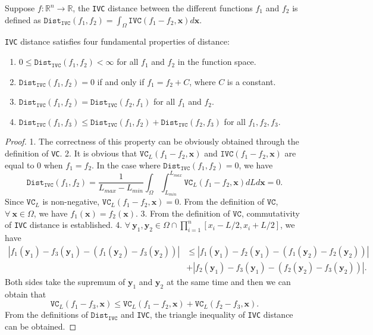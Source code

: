 \documentclass[final]{siamart220329}
\newtheorem{theoretical insights}{Theoretical insights}
\newtheorem{practical takeaway}{Practical takeaway}
\begin{document}
{{{{\begin{definition}\label{IVCD}  Suppose \(f:\mathbb{R}^n \rightarrow\mathbb{R}\), the \texttt{IVC} distance between the different functions \(f_1\) and \(f_2\) is defined as  
\(\texttt{Dist}_{\texttt{IVC}}(f_1,f_2)=\int_{\Omega}\texttt{IVC}(f_1-f_2,{\bm x})d{\bm x}.
\) 
\end{definition}
 
\begin{theorem}
\texttt{IVC} distance satisfies four fundamental properties of distance:

\begin{enumerate}
\item $0\leq \texttt{Dist}_{\texttt{IVC}}(f_1,f_2)<\infty$ for all $f_1$ and $f_2$ in the function space.

\item $\texttt{Dist}_{\texttt{IVC}}(f_1,f_2)=0$ if and only if $f_1=f_2+C$, where $C$ is a constant.

\item $\texttt{Dist}_{\texttt{IVC}}(f_1,f_2)=\texttt{Dist}_{\texttt{IVC}}(f_2,f_1)$ for all $f_1$ and $f_2$.

\item $\texttt{Dist}_{\texttt{IVC}}(f_1,f_3)\leq \texttt{Dist}_{\texttt{IVC}}(f_1,f_2)+\texttt{Dist}_{\texttt{IVC}}(f_2,f_3)$ for all $f_1, f_2, f_3$.
\end{enumerate}

\end{theorem}

\begin{proof}

1. The correctness of this property can be obviously obtained through the definition of \texttt{VC}. 
2. It is obvious that $\texttt{VC}_L(f_1-f_2,{\bm x})$ and  $\texttt{IVC}(f_1-f_2,{\bm x})$ are equal to 0 when $f_1=f_2$. In the case where $\texttt{Dist}_{\texttt{IVC}}(f_1,f_2)=0$, we have 
\[
\texttt{Dist}_{\texttt{IVC}}(f_1,f_2)=\frac{1}{L_{max}-L_{min}}\int_{\Omega}\int_{L_{min}}^{L_{max}} \texttt{VC}_{L}(f_1-f_2,{\bm x})dLd{\bm x}=0.
\]
Since $\texttt{VC}_{L}$ is non-negative, $\texttt{VC}_{L}(f_1-f_2,{\bm x})=0$. From the definition of $\texttt{VC}$, $\forall\ {\bm x}\in\Omega$, we have $f_1({\bm x})=f_2({\bm x})$. 
3. From the definition of $\texttt{VC}$, commutativity of \texttt{IVC} distance is established. 
4. $\forall\ {\bm y}_1, {\bm y}_2 \in \Omega \cap \prod_{i=1}^{n} [{x}_i-L/2, {x}_i+L/2]$, we have
\[\begin{aligned}
|f_1({\bm y}_1)-f_3({\bm y}_1)-(f_1({\bm y}_2)-f_3({\bm y}_2))|
&\leq|f_1({\bm y}_1)-f_2({\bm y}_1)-(f_1({\bm y}_2)-f_2({\bm y}_2))|\\
&+|f_2({\bm y}_1)-f_3({\bm y}_1)-(f_2({\bm y}_2)-f_3({\bm y}_2))|. 
\end{aligned}\] 
Both sides take the supremum of ${\bm y}_1$ and ${\bm y}_2$ at the same time and then we can obtain that 
\[\texttt{VC}_L(f_1-f_3,{\bm x})\leq\texttt{VC}_L(f_1-f_2,{\bm x})+\texttt{VC}_L(f_2-f_3,{\bm x}).
\]
From the definitions of $\texttt{Dist}_{\texttt{IVC}}$ and \texttt{IVC}, the triangle inequality of \texttt{IVC} distance can be obtained.
\end{proof}

}}}}
\end{document}
